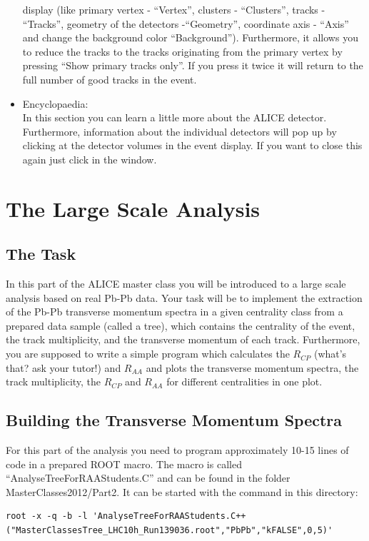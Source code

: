 \documentclass{article}
\begin{document}
\begin{itemize}
  display (like primary vertex - ``Vertex'', clusters - ``Clusters'', 
  tracks - ``Tracks'', geometry of the detectors -``Geometry'', coordinate 
  axis - ``Axis'' and change the background color ``Background''). Furthermore,
  it allows you to reduce the tracks to the tracks originating from the 
  primary vertex by pressing ``Show primary tracks only''. If you press it 
  twice it will return to the full number of good tracks in the event.
\item Encyclopaedia:\\
  In this section you can learn a little more about the ALICE detector.
  Furthermore, information about the individual detectors will pop up by 
  clicking at the detector volumes in the event display. If you want to close 
  this again just click in the window.
\end{itemize}

\section{The Large Scale Analysis}
\subsection{The Task}
In this part of the ALICE master class you will be introduced to a large scale 
analysis based on real Pb-Pb data. Your task will be to implement the 
extraction of the Pb-Pb transverse momentum spectra in a given centrality 
class from a prepared data sample (called a tree), which contains the 
centrality of the event, the track multiplicity, and the transverse momentum 
of each track. Furthermore, you are supposed to write a simple program which 
calculates the $R_{CP}$ (what's that? ask your tutor!) and $R_{AA}$ and plots 
the transverse momentum spectra, the track multiplicity, the $R_{CP}$ and 
$R_{AA}$ for different centralities in one plot. 

\subsection{Building the Transverse Momentum Spectra}

For this part of the analysis you need to program approximately 10-15 lines of 
code in a prepared ROOT macro. The macro is called 
``AnalyseTreeForRAAStudents.C'' and can be found in the folder 
MasterClasses2012/Part2. It can be started with the command in this directory:

\begin{lstlisting}[]
root -x -q -b -l 'AnalyseTreeForRAAStudents.C++("MasterClassesTree_LHC10h_Run139036.root","PbPb","kFALSE",0,5)'
\end{lstlisting}
\end{document}
